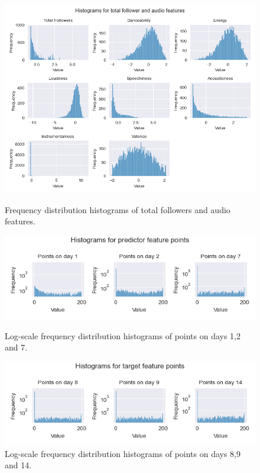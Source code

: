 \documentclass{article}
\begin{document}
\begin{figure}
  \begin{adjustwidth}{-2cm}{-2cm}  %
    \centering
    \begin{minipage}[b]{0.5\linewidth}
      \centering
      \includegraphics[width=\linewidth]{figures/fol_audio_hist.png}
      \caption{Frequency distribution histograms of total followers and audio features.}
      \label{fig:fol_aud_hist}
    \end{minipage}%
    \begin{minipage}[b]{0.5\linewidth}
      \centering
      \includegraphics[width=\linewidth]{figures/predict_point_hist.png}
      \caption{Log-scale frequency distribution histograms of points on days 1,2 and 7.}
      \label{fig:pred_p_hist}

      \vspace{4mm} %

      \includegraphics[width=\linewidth]{figures/target_point_hist.png}
      \caption{Log-scale frequency distribution histograms of points on days 8,9 and 14.}
      \label{fig:targ_p_hist}
    \end{minipage}
  \end{adjustwidth}
\end{figure}
\end{document}
